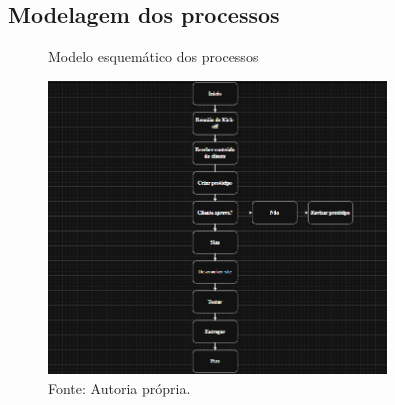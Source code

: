 \subsection{Modelagem dos processos}

\begin{figure} [h!]	
    \centering

    \caption{Modelo esquemático dos processos}
    \includegraphics[width=0.8\textwidth]{Figures/modelo_esquematico_dos_processos.png}
    \caption*{Fonte: Autoria própria.}
    \label{fig:modelagem_dos_processos}
\end{figure}